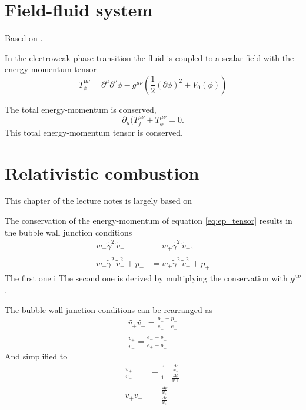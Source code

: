 \section{Field-fluid system}
Based on \cite{moore_pt_1995}.

In the electroweak phase transition the fluid is coupled to a scalar field with the energy-momentum tensor
\cites[eq. 2.9]{hindmarsh_gw_pt_2019}
\begin{equation}
T_\phi^{\mu \nu}
= \partial^\mu \partial^\nu \phi
- g^{\mu \nu} \left(\frac{1}{2} (\partial \phi)^2 + V_0 (\phi) \right)
\end{equation}

The total energy-momentum is conserved,
\cite[eq. 5.17]{lecture_notes}
\begin{equation}
\partial_\mu (T_f^{\mu \nu} + T_\phi^{\mu \nu} = 0.
\label{eq:ep_conservation}
\end{equation}
This total energy-momentum tensor is conserved.


\section{Relativistic combustion}
This chapter of the lecture notes is largely based on
\cites{hindmarsh_gw_pt_2019}{espinosa_energy_2010}

The conservation of the energy-momentum of equation \ref{eq:ep_tensor} results in the bubble wall junction conditions
\cites[eq. 7.22]{lecture_notes}[eq. B.2-3]{hindmarsh_gw_pt_2019}
\begin{align}
w_- \tilde{\gamma}_-^2 \tilde{v}_- &= w_+ \tilde{\gamma}_+^2 \tilde{v}_+, \\
w_- \tilde{\gamma}_-^2 \tilde{v}_-^2 + p_- &= w_+ \tilde{\gamma}_+^2 \tilde{v}_+^2 + p_+
\end{align}
The first one i
The second one is derived by multiplying the conservation with $g^{\mu \nu}$. 

The bubble wall junction conditions can be rearranged as
\cites[eq. 7.32]{lecture_notes}[eq. 6-7]{giese_2020}
\begin{align}
\tilde{v_+} \tilde{v_-} = \frac{p_+ - p_-}{e_+ - e_-} \\
\frac{\tilde{v}_+}{\tilde{v}_-} = \frac{e_- + p_+}{e_+ + p_-}
\end{align}
And simplified to
\begin{align}
\frac{v_+}{v_-} &= \frac{1 - \frac{\Delta e}{w_+}}{1 - \frac{\Delta p}{w+}} \\
v_+ v_- &= \frac{\frac{\Delta p}{w_+}}{\frac{\Delta e}{w_+}}
\end{align}

